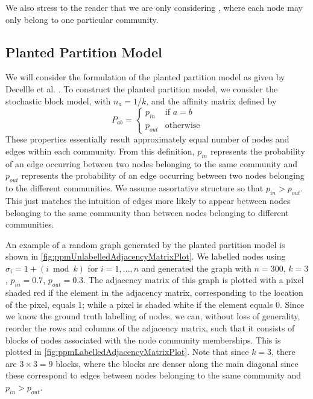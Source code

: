 We also stress to the reader that we are only considering , where each node may only belong to one particular community.


\subsection{Planted Partition Model}
\label{subsec:plantedPartitionModel}

We will consider the formulation of the planted partition model as given by Decellle et al. \cite{DKM+13}.
To construct the planted partition model, we consider the stochastic block model, with $n_{a} = 1/k$, and the affinity matrix defined by
\begin{equation}
	\label{def:ppmAffinityMatrix}
	P_{ab} =
	\begin{cases}
		p_{in} & \text{if } a = b\\
		p_{out} & \text{otherwise}
	\end{cases}
\end{equation}
These properties essentially result approximately equal number of nodes and edges within each community.
From this definition, $p_{in}$ represents the probability of an edge occurring between two nodes belonging to the same community and $p_{out}$ represents the probability of an edge occurring between two nodes belonging to the different communities.
We assume assortative structure so that $p_{in} > p_{out}$. This just matches the intuition of edges more likely to appear between nodes belonging to the same community than between nodes belonging to different communities.

An example of a random graph generated by the planted partition model is shown in \cref{fig:ppmUnlabelledAdjacencyMatrixPlot}.
We labelled nodes using $\sigma_{i} = 1 + (i \bmod{k})$ for $i = 1,\dots,n$ and generated the graph with $n = 300$, $k = 3$, $p_{in} = 0.7$, $p_{out} = 0.3$.
The adjacency matrix of this graph is plotted with a pixel shaded red if the element in the adjacency matrix, corresponding to the location of the pixel, equals 1; while a pixel is shaded white if the element equals 0.
Since we know the ground truth labelling of nodes, we can, without loss of generality, reorder the rows and columns of the adjacency matrix, such that it consists of blocks of nodes associated with the node community memberships.
This is plotted in \cref{fig:ppmLabelledAdjacencyMatrixPlot}. Note that since $k = 3$, there are $3 \times 3 = 9$ blocks, where the blocks are denser along the main diagonal since these correspond to edges between nodes belonging to the same community and $p_{in} > p_{out}$.

